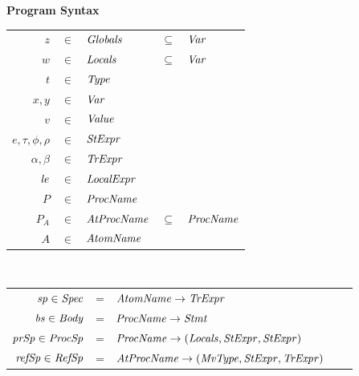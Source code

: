 

\begin{figure}
\setlength{\tabcolsep}{3pt}
{\bf Program Syntax} \\
\begin{tabular}{rclcl}
$z$ & $\in$ & $\mathit{Globals}$ & $\subseteq$ &$\mathit{Var}$ \\
$w$ & $\in$ & $\mathit{Locals}$ & $\subseteq$ & $\mathit{Var}$ \\
$t$ & $\in$ & $\mathit{Type}$ \\
$x,y$ & $\in$ & $\mathit{Var}$ \\
$v$ &  $\in$ & $\mathit{Value}$ \\
$e, \tau, \phi, \rho$ & $\in$ & $\mathit{StExpr}$ \\
$\alpha, \beta$ & $\in$ & $\mathit{TrExpr}$ \\
$\mathit{le}$ & $\in$ & $\mathit{LocalExpr}$ \\
$P$ & $\in$ & $\mathit{ProcName}$ \\
$P_{A}$ & $\in$ & $\mathit{AtProcName}$ & $\subseteq$ & $\mathit{ProcName}$ \\
$A$ & $\in$ & $\mathit{AtomName}$ \\
\end{tabular}\\
\begin{tabular}{rclcl}
$\mathit{sp} \in \mathit{Spec}$ & = & $\mathit{AtomName} \rightarrow \mathit{TrExpr}$ \\
$\mathit{bs} \in \mathit{Body}$ & = & $\mathit{ProcName} \rightarrow \mathit{Stmt}$ \\
$\mathit{prSp} \in \mathit{ProcSp}$ & = & $\mathit{ProcName} \rightarrow (\mathit{Locals},\mathit{StExpr},\mathit{StExpr})$\\
$\mathit{refSp} \in \mathit{RefSp}$ & = & $\mathit{AtProcName} \rightarrow (\mathit{MvType},\mathit{StExpr},\mathit{TrExpr})$

\end{tabular}
\end{figure}
